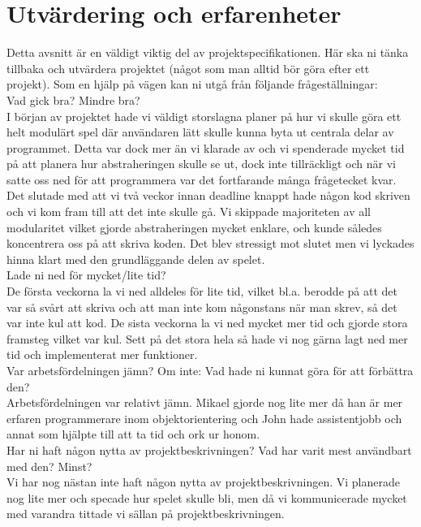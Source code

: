 \section{Utvärdering och erfarenheter}
{\color{red}Detta avsnitt är en väldigt viktig del av projektspecifikationen. Här ska ni tänka tillbaka och utvärdera projektet (något som man alltid bör göra efter ett projekt). Som en hjälp på vägen kan ni utgå från följande frågeställningar:\\
Vad gick bra? Mindre bra?\\}
I början av projektet hade vi väldigt storslagna planer på hur vi skulle göra ett helt modulärt spel där användaren lätt skulle kunna byta ut centrala delar av programmet. Detta var dock mer än vi klarade av och vi spenderade mycket tid på att planera hur abstraheringen skulle se ut, dock inte tillräckligt och när vi satte oss ned för att programmera var det fortfarande många frågetecket kvar. Det slutade med att vi två veckor innan deadline knappt hade någon kod skriven och vi kom fram till att det inte skulle gå. Vi skippade majoriteten av all modularitet vilket gjorde abstraheringen mycket enklare, och kunde således koncentrera oss på att skriva koden. Det blev stressigt mot slutet men vi lyckades hinna klart med den grundläggande delen av spelet. \\

{\color{red}Lade ni ned för mycket/lite tid?\\}
De första veckorna la vi ned alldeles för lite tid, vilket bl.a. berodde på att det var så svårt att skriva och att man inte kom någonstans när man skrev, så det var inte kul att kod. De sista veckorna la vi ned mycket mer tid och gjorde stora framsteg vilket var kul. Sett på det stora hela så hade vi nog gärna lagt ned mer tid och implementerat mer funktioner.\\

{\color{red}Var arbetsfördelningen jämn? Om inte: Vad hade ni kunnat göra för att förbättra den?\\}
Arbetsfördelningen var relativt jämn. Mikael gjorde nog lite mer då han är mer erfaren programmerare inom objektorientering och John hade assistentjobb och annat som hjälpte till att ta tid och ork ur honom.\\

{\color{red}Har ni haft någon nytta av projektbeskrivningen? Vad har varit mest användbart med den? Minst?\\}
Vi har nog nästan inte haft någon nytta av projektbeskrivningen. Vi planerade nog lite mer och specade hur spelet skulle bli, men då vi kommunicerade mycket med varandra tittade vi sällan på projektbeskrivningen. \\

